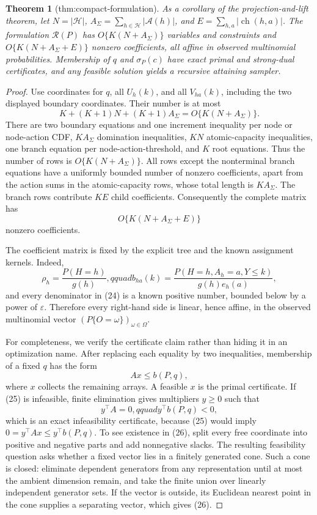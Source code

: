 \documentclass{article}
\newtheorem{theorem}{Theorem}
\begin{document}
\begin{theorem}[thm:compact-formulation]\label{thm:compact-formulation}
As a corollary of the projection-and-lift theorem, let \(N=\lvert\mathcal H\rvert\), \(A_\Sigma=\sum_{h\in\mathcal H}\lvert\mathcal A(h)\rvert\), and \(E=\sum_{h,a}\lvert\operatorname{ch}(h,a)\rvert\). The formulation \(\mathcal R(P)\) has \(O\{K(N+A_\Sigma)\}\) variables and constraints and \(O\{K(N+A_\Sigma+E)\}\) nonzero coefficients, all affine in observed multinomial probabilities. Membership of \(q\) and \(\sigma_P(c)\) have exact primal and strong-dual certificates, and any feasible solution yields a recursive attaining sampler.
\end{theorem}
\begin{proof}
Use coordinates for \(q\), all \(U_h(k)\), and all \(V_{ha}(k)\), including the two displayed boundary coordinates.  Their number is at most
\[
 K+(K+1)N+(K+1)A_\Sigma=O\{K(N+A_\Sigma)\}.              \tag{22}
\]
There are two boundary equations and one increment inequality per node or node-action CDF, \(K A_\Sigma\) domination inequalities, \(K N\) atomic-capacity inequalities, one branch equation per node-action-threshold, and \(K\) root equations.  Thus the number of rows is \(O\{K(N+A_\Sigma)\}\).  All rows except the nonterminal branch equations have a uniformly bounded number of nonzero coefficients, apart from the action sums in the atomic-capacity rows, whose total length is \(K A_\Sigma\).  The branch rows contribute \(K E\) child coefficients.  Consequently the complete matrix has
\[
 O\{K(N+A_\Sigma+E)\}                                    \tag{23}
\]
nonzero coefficients.

The coefficient matrix is fixed by the explicit tree and the known assignment kernels.  Indeed,
\[
 \rho_h=\frac{P(H=h)}{g(h)},qquad
 b_{ha}(k)=\frac{P(H=h,A_h=a,Y\leq k)}{g(h)e_h(a)},        \tag{24}
\]
and every denominator in (24) is a known positive number, bounded below by a power of \(\varepsilon\).  Therefore every right-hand side is linear, hence affine, in the observed multinomial vector \((P\{O=\omega\})_{\omega\in\Omega}\).

For completeness, we verify the certificate claim rather than hiding it in an optimization name.  After replacing each equality by two inequalities, membership of a fixed \(q\) has the form
\[
 Ax\leq b(P,q),                                           \tag{25}
\]
where \(x\) collects the remaining arrays.  A feasible \(x\) is the primal certificate.  If (25) is infeasible, finite elimination gives multipliers \(y\geq0\) such that
\[
 y^\top A=0,qquad y^\top b(P,q)<0,                       \tag{26}
\]
which is an exact infeasibility certificate, because (25) would imply \(0=y^\top Ax\leq y^\top b(P,q)\).  To see existence in (26), split every free coordinate into positive and negative parts and add nonnegative slacks.  The resulting feasibility question asks whether a fixed vector lies in a finitely generated cone.  Such a cone is closed: eliminate dependent generators from any representation until at most the ambient dimension remain, and take the finite union over linearly independent generator sets.  If the vector is outside, its Euclidean nearest point in the cone supplies a separating vector, which gives (26).


\end{proof}
\end{document}
